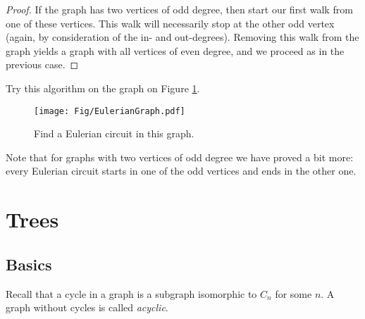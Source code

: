 \begin{page}
\begin{proof}
If the graph has two vertices of odd degree, then start our first walk from one of these vertices.
This walk will necessarily stop at the other odd vertex (again, by consideration of the in- and out-degrees).
Removing this walk from the graph yields a graph with all vertices of even degree, and we proceed as in the previous case.
\end{proof}

Try this algorithm on the graph on Figure \ref{fig:EulerianGraph}.

\begin{figure}[h]
\begin{center}
\texttt{[image: Fig/EulerianGraph.pdf]}
\end{center}
\caption{Find a Eulerian circuit in this graph.}
\label{fig:EulerianGraph}
\end{figure}

Note that for graphs with two vertices of odd degree we have proved a bit more:
every Eulerian circuit starts in one of the odd vertices and ends in the other one.












\end{page}

\begin{page}
\setcounter{section}{2}
\setcounter{subsection}{1}
\setcounter{dfn}{0}
\label{portion:207}

\section{Trees}

\end{page}

\begin{page}
\setcounter{section}{2}
\setcounter{subsection}{1}
\setcounter{dfn}{0}
\label{portion:208}

\subsection{Basics}
Recall that a cycle in a graph is a subgraph isomorphic to $C_n$ for some $n$.
A graph without cycles is called \emph{acyclic}.

\end{page}

